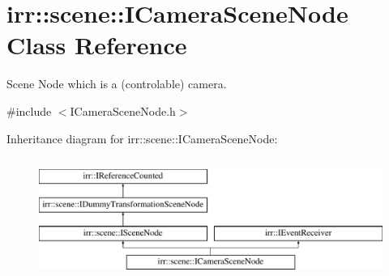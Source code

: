 \hypertarget{classirr_1_1scene_1_1ICameraSceneNode}{}\section{irr\+:\+:scene\+:\+:I\+Camera\+Scene\+Node Class Reference}
\label{classirr_1_1scene_1_1ICameraSceneNode}


Scene Node which is a (controlable) camera.  




{\ttfamily \#include $<$I\+Camera\+Scene\+Node.\+h$>$}

Inheritance diagram for irr\+:\+:scene\+:\+:I\+Camera\+Scene\+Node\+:\begin{figure}[H]
\begin{center}
\leavevmode
\includegraphics[height=4.000000cm]{classirr_1_1scene_1_1ICameraSceneNode}
\end{center}
\end{figure}
